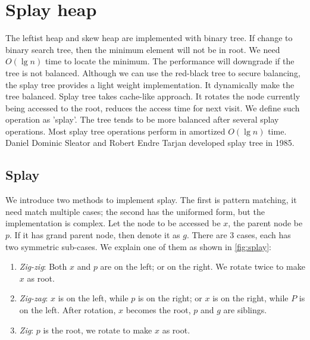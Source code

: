 \documentclass[b5paper]{article}
\begin{document}
\section{Splay heap}
\label{splayheap} 

The leftist heap and skew heap are implemented with binary tree. If change to binary search tree, then the minimum element will not be in root. We need $O(\lg n)$ time to locate the minimum. The performance will downgrade if the tree is not balanced. Although we can use the red-black tree to secure balancing, the splay tree provides a light weight implementation. It dynamically make the tree balanced. Splay tree takes cache-like approach. It rotates the node currently being accessed to the root, reduces the access time for next visit. We define such operation as 'splay'. The tree tends to be more balanced after several splay operations. Most splay tree operations perform in amortized $O(\lg n)$ time. Daniel Dominic Sleator and Robert Endre Tarjan developed splay tree in 1985\cite{wiki-splay-tree}\cite{self-adjusting-trees}.

\subsection{Splay}

We introduce two methods to implement splay. The first is pattern matching, it need match multiple cases; the second has the uniformed form, but the implementation is complex. Let the node to be accessed be $x$, the parent node be $p$. If it has grand parent node, then denote it as $g$. There are 3 cases, each has two symmetric sub-cases. We explain one of them as shown in \ref{fig:splay}:

\begin{enumerate}
\item {\em Zig-zig}: Both $x$ and $p$ are on the left; or on the right. We rotate twice to make $x$ as root.

\item {\em Zig-zag}: $x$ is on the left, while $p$ is on the right; or $x$ is on the right, while $P$ is on the left. After rotation, $x$ becomes the root, $p$ and $g$ are siblings.

\item {\em Zig}: $p$ is the root, we rotate to make $x$ as root.
\end{enumerate}
\end{document}
